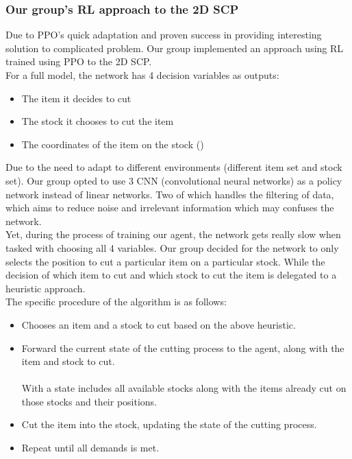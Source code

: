\documentclass[a4paper]{article}
\begin{document}
    \subsubsection{Our group's RL approach to the 2D SCP}
    \label{sec:RL-agent}
    Due to PPO's quick adaptation and proven success in providing interesting solution to complicated problem. Our group implemented an approach using RL trained using PPO to the 2D SCP.
    \vspace{0.2cm}\\
    For a full model, the network has 4 decision variables as outputs:
    \begin{itemize}
        \item The item it decides to cut
        \item The stock it chooses to cut the item
        \item The coordinates of the item on the stock (\boldmath{$[x, y]$})
    \end{itemize}  
    \vspace{0.2cm}
    Due to the need to adapt to different environments (different item set and stock set). Our group opted to use 3 CNN (convolutional neural networks) as a policy network instead of linear networks. Two of which handles the filtering of data, which aims to reduce noise and irrelevant information which may confuses the network.
    \vspace{0.2cm}\\
    Yet, during the process of training our agent, the network gets really slow when tasked with choosing all 4 variables. Our group decided for the network to only selects the position to cut a particular item on a particular stock. While the decision of which item to cut and which stock to cut the item is delegated to a heuristic approach.
    \vspace{0.2cm}\\
    The specific procedure of the algorithm is as follows:
    \begin{itemize}
        \item Chooses an item and a stock to cut based on the above heuristic.
        \item Forward the current state of the cutting process to the agent, along with the item and stock to cut. 
            \\ \\
            With a state includes all available stocks along with the items already cut on those stocks and their positions.
        \item Cut the item into the stock, updating the state of the cutting process.
        \item Repeat until all demands is met.
    \end{itemize}
\end{document}
